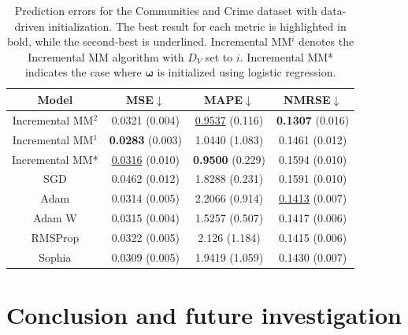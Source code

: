 \documentclass{article}
\def\vomega{{\bm{\omega}}}
\begin{document}
\begin{table}[H]
\centering
\caption{Prediction errors for the Communities and Crime dataset with data-driven initialization. The best result for each metric is highlighted in bold, while the second-best is underlined. Incremental MM$^i$ denotes the Incremental MM algorithm with $D_V$ set to $i$. Incremental MM* indicates the case where $\vomega$ is initialized using logistic regression.} 
\label{Criminal_res}
\vspace{0.3em}
\begin{tabular}{|c|c|c|c|}
\toprule
\textbf{Model} & \textbf{MSE$\downarrow$} & \textbf{MAPE$\downarrow$} & \textbf{NMRSE$\downarrow$} \\
\midrule
Incremental MM$^2$ & 0.0321 (0.004) & \underline{0.9537} (0.116) & \textbf{0.1307} (0.016) \\
Incremental MM$^1$ & \textbf{0.0283} (0.003) & 1.0440 (1.083) & 0.1461 (0.012) \\
Incremental MM* & \underline{0.0316} (0.010) & \textbf{0.9500} (0.229) & 0.1594 (0.010) \\
SGD           & 0.0462 (0.012) & 1.8288 (0.231) & 0.1591 (0.010) \\
Adam          & 0.0314 (0.005) & 2.2066 (0.914) & \underline{0.1413} (0.007) \\
Adam W        & 0.0315 (0.004) & 1.5257 (0.507) & 0.1417 (0.006) \\
RMSProp       & 0.0322 (0.005) & 2.126 (1.184)  & 0.1415 (0.006) \\
Sophia        & 0.0309 (0.005) & 1.9419 (1.059) & 0.1430 (0.007) \\
\bottomrule
\end{tabular}
\end{table}


\section{Conclusion and future investigation}\label{sec_conclusion_future}
\end{document}

